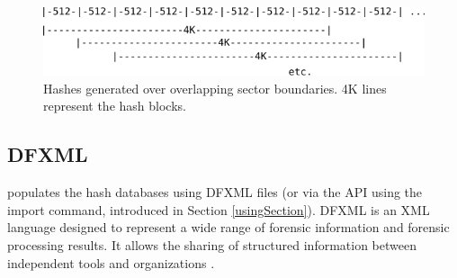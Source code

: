 \documentclass[11pt,fleqn]{article} %
\begin{document}
\begin{figure}
	\center
	\includegraphics[scale=1.1]{drawings/sector_boundaries}
	\caption{Hashes generated over overlapping sector boundaries. 4K lines represent the hash blocks.}
	\label{fig:sectorboundaries}
\end{figure}



\subsection{DFXML}
\hash populates the hash databases using DFXML files (or via the API using the import command, introduced in Section \ref{usingSection}). DFXML is an XML language designed to represent a wide range of forensic information and forensic processing results. It allows the sharing of structured information between independent tools and organizations \cite{dfxmlpaper}.\\
\end{document}
